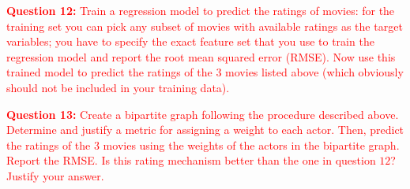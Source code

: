 \documentclass[11pt]{article}
\begin{document}
\textcolor{red}{
    \textbf{Question 12:} Train a regression model to predict the ratings of movies: for the training set you can pick any subset of movies with available ratings as the target variables; you have to specify the exact feature set that you use to train the regression model and report the root mean squared error (RMSE). Now use this trained model to predict the ratings of the $3$ movies listed above (which obviously should not be included in your training data).
}



\textcolor{red}{
    \textbf{Question 13:} Create a bipartite graph following the procedure described above. Determine and justify a metric for assigning a weight to each actor. Then, predict the ratings of the $3$ movies using the weights of the actors in the bipartite graph. Report the RMSE. Is this rating mechanism better than the one in question $12$? Justify your answer.
}
\end{document}
